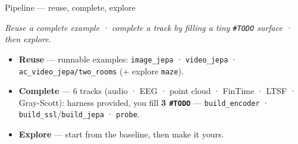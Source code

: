 \documentclass[aspectratio=169]{beamer}
\begin{document}
\begin{frame}{Pipeline — reuse, complete, explore}
  \begin{center}\small\itshape Reuse a complete example · complete a track by filling a tiny \texttt{\#TODO} surface · then explore.\end{center}
  \vspace{0.3cm}
  {\footnotesize
  \begin{itemize}\itemsep0.5em
    \item \textbf{Reuse} — runnable examples: \texttt{image\_jepa} · \texttt{video\_jepa} · \texttt{ac\_video\_jepa/two\_rooms} \;(+ explore \texttt{maze}).
    \item \textbf{Complete} — 6 tracks (audio · EEG · point cloud · FinTime · LTSF · Gray-Scott): harness provided, you fill \textbf{3 \texttt{\#TODO}} — \texttt{build\_encoder} · \texttt{build\_ssl}/\texttt{build\_jepa} · \texttt{probe}.
    \item \textbf{Explore} — start from the baseline, then make it yours.
  \end{itemize}}
  \vfill
\end{frame}
\end{document}
